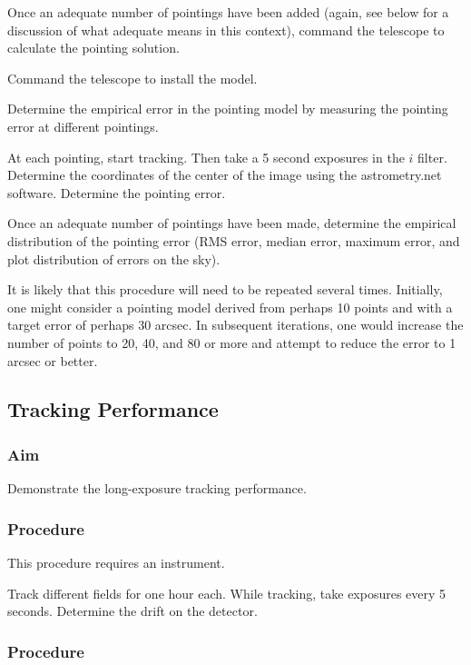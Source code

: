 \documentclass{article}
\begin{document}
Once an adequate number of pointings have been added (again, see below for a discussion of what adequate means in this context), command the telescope to calculate the pointing solution.

Command the telescope to install the model.

Determine the empirical error in the pointing model by measuring the pointing error at different pointings.

At each pointing, start tracking. Then take a 5 second exposures in the $i$ filter. Determine the coordinates of the center of the image using the astrometry.net software. Determine the pointing error. 

Once an adequate number of pointings have been made, determine the empirical distribution of the pointing error (RMS error, median error, maximum error, and plot distribution of errors on the sky).

It is likely that this procedure will need to be repeated several times. Initially, one might consider a pointing model derived from perhaps 10 points and with a target error of perhaps 30 arcsec. In subsequent iterations, one would increase the number of points to 20, 40, and 80 or more and attempt to reduce the error to 1 arcsec or better.



\subsection{Tracking Performance}

\subsubsection{Aim}

Demonstrate the long-exposure tracking performance.

\subsubsection{Procedure}

This procedure requires an instrument.

Track different fields for one hour each. While tracking, take exposures every 5 seconds. Determine the drift on the detector.

\subsubsection{Procedure}
\end{document}
